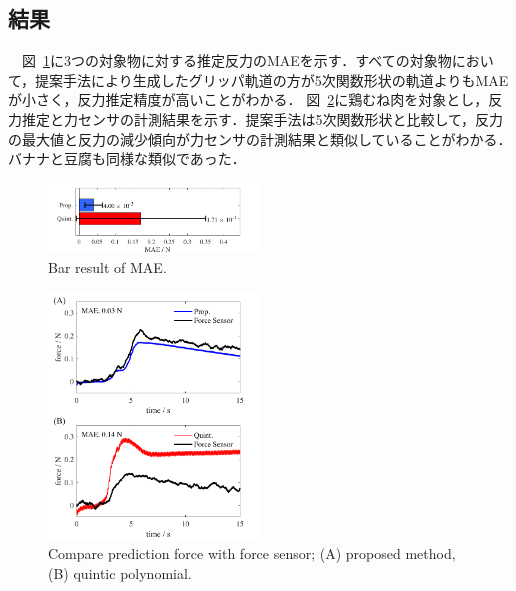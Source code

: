 \documentclass[a4paper]{jarticle}
\begin{document}
\subsection{結果}
　図~\ref{fig:bar_result}に3つの対象物に対する推定反力のMAEを示す．すべての対象物において，提案手法により生成したグリッパ軌道の方が5次関数形状の軌道よりもMAEが小さく，反力推定精度が高いことがわかる．
図~\ref{fig:prop_quint}に鶏むね肉を対象とし，反力推定と力センサの計測結果を示す．提案手法は5次関数形状と比較して，反力の最大値と反力の減少傾向が力センサの計測結果と類似していることがわかる．
バナナと豆腐も同様な類似であった．
\begin{figure}[tb]
    \centering
    \includegraphics[width=0.5\textwidth]{bar_result_chiken.pdf}
    \caption{Bar result of MAE.}  
    \label{fig:bar_result}
\end{figure}
\begin{figure}[tb]
    \centering
    \includegraphics[width=0.5\textwidth]{prop_quint.pdf}
    \captionsetup{width=0.9\linewidth} %
    \caption{Compare prediction force with force sensor; (A) proposed method, (B) quintic polynomial.}
    \label{fig:prop_quint}
\end{figure}
\end{document}
